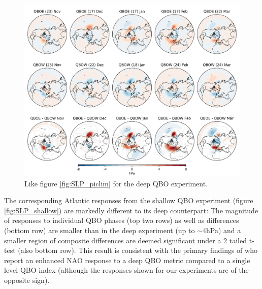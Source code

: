 \begin{figure}[h!]
\begin{center}
\noindent\includegraphics[width =0.8\linewidth]{Figures/Figures-deepQBO/SLP_composites_individual_months_QBO_phases_U_d_higher_50hPa_5thresh.png}
\caption[]{Like figure \ref{fig:SLP_piclim} for the deep QBO experiment.}
\label{fig:SLP_deep}
\end{center}
\end{figure}

The corresponding Atlantic responses from the shallow QBO experiment (figure \ref{fig:SLP_shallow}) are markedly different to its deep counterpart: The magnitude of responses to individual QBO phases (top two rows) as well as differences (bottom row) are smaller than in the deep experiment (up to $\sim$4hPa) and a smaller region of composite differences are deemed significant under a 2 tailed t-test (also bottom row). This result is consistent with the primary findings of \cite{andrewsObserved2019d} who report an enhanced NAO response to a deep QBO metric compared to a single level QBO index (although the responses shown for our experiments are of the opposite sign).

